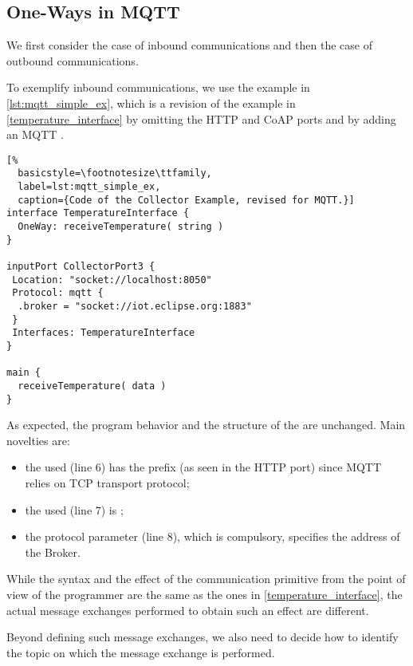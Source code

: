 \subsection{One-Ways in MQTT}
\label{sub:ow_in_mqtt}

We first consider the case of inbound communications and then the case of
outbound communications.

To exemplify  inbound communications, we use the example in
\cref{lst:mqtt_simple_ex}, which is a revision of the example in
\cref{temperature_interface} by omitting the HTTP and CoAP ports and by adding an
MQTT .

\begin{lstlisting}[%
  basicstyle=\footnotesize\ttfamily,
  label=lst:mqtt_simple_ex, 
  caption={Code of the Collector Example, revised for MQTT.}]
interface TemperatureInterface {
  OneWay: receiveTemperature( string )
}

inputPort CollectorPort3 {
 Location: "socket://localhost:8050"
 Protocol: mqtt {
  .broker = "socket://iot.eclipse.org:1883"
 }
 Interfaces: TemperatureInterface
}

main {
  receiveTemperature( data )
}
\end{lstlisting}

As expected, the program behavior and the structure of the 
are unchanged. Main novelties are:
%
\begin{itemize}
  \item the used  (line 6) has the prefix 
   (as seen in the HTTP port) since MQTT relies on TCP
  transport protocol;
  \item the used  (line 7) is ;
  \item the  protocol parameter (line 8), which is
  compulsory, specifies the address of the Broker.
\end{itemize}

While the syntax and the effect of the communication primitive from the point of
view of the programmer are the same as the ones in \cref{temperature_interface},
the actual message exchanges performed to obtain such an effect are different.

Beyond defining such message exchanges, we also need to decide how to identify
the topic on which the message exchange is performed.

